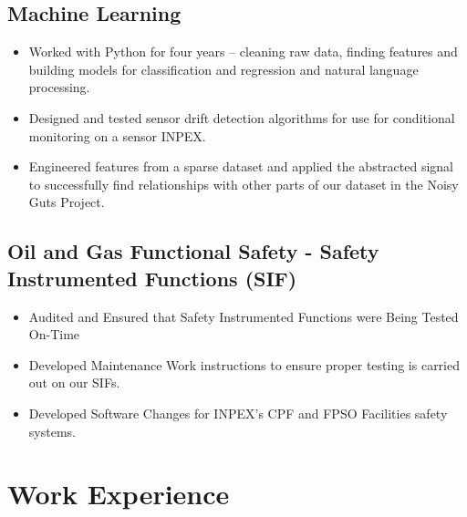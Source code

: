 \documentclass{article}[a4page]
\begin{document}
\subsection*{Machine Learning}
\begin{itemize}
\item Worked with Python for four years – cleaning raw data, finding features and building models for classification and regression and natural language processing.
\item Designed and tested sensor drift detection algorithms for use for conditional monitoring on a sensor INPEX.
\item Engineered features from a sparse dataset and applied the abstracted signal to successfully find relationships with other parts of our dataset in the Noisy Guts Project.
\end{itemize}

\subsection*{Oil and Gas Functional Safety - Safety Instrumented Functions (SIF)}
\begin{itemize}
\item Audited and Ensured that Safety Instrumented Functions were Being Tested On-Time
\item Developed Maintenance Work instructions to ensure proper testing is carried out on our SIFs.
\item Developed Software Changes for INPEX's CPF and FPSO Facilities safety systems.
\end{itemize}

\section*{Work Experience}
\end{document}
